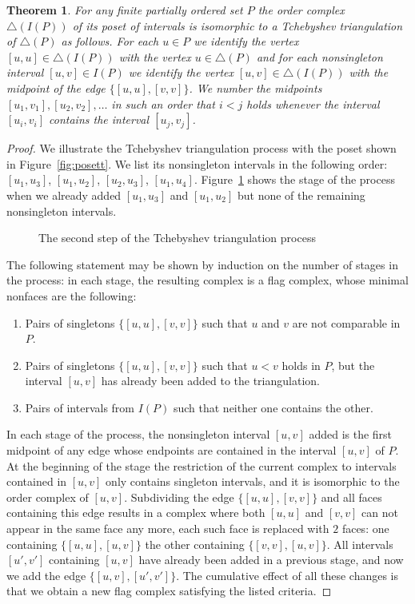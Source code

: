 \documentclass[reqno,12pt]{amsart}
\numberwithin{equation}{section}
\newtheorem{theorem}{Theorem}[section]
\newcommand{\0}{\widehat{0}}
\newcommand{\1}{\widehat{1}}
\newcommand{\2}{\widehat{2}}
\begin{document}
\begin{theorem}
\label{thm:it}
For any finite partially ordered set $P$ the order complex
$\triangle(I(P))$ of its poset of intervals is isomorphic to a
Tchebyshev triangulation of $\triangle(P)$ as follows. For each $u\in
P$ we identify the vertex $[u,u]\in \triangle(I(P))$ with the vertex $u\in
\triangle(P)$ and for each nonsingleton interval $[u,v]\in I(P)$ we
identify the vertex $[u,v]\in \triangle(I(P))$ with the midpoint of the
edge $\{[u,u],[v,v]\}$. We number the midpoints $[u_1,v_1], [u_2,v_2], \ldots$  
in such an order that $i<j$ holds whenever the interval $[u_i,v_i]$
contains the interval $[u_j,v_j]$.
\end{theorem}  
\begin{proof}
We illustrate the Tchebyshev triangulation process with the poset shown
in Figure~\ref{fig:posett}. We list its nonsingleton intervals in the
following order:
$[u_1,u_3]$, $[u_1,u_2]$, $[u_2,u_3]$, $[u_1,u_4]$. Figure~\ref{fig:posettpart}
shows the stage of the process when we already added $[u_1,u_3]$ and
$[u_1,u_2]$ but none of the remaining nonsingleton intervals.
\begin{figure}[h]
  
\caption{The second step of the Tchebyshev triangulation process}  
\label{fig:posettpart}
\end{figure}
The following statement may be shown by induction on the number of stages
in the process: in each stage, the resulting complex is a flag complex,
whose minimal nonfaces are the following:
\begin{enumerate}
\item Pairs of singletons $\{[u,u],[v,v]\}$ such that $u$ and $v$ are
  not comparable in $P$.
\item Pairs of singletons $\{[u,u],[v,v]\}$ such that $u<v$ holds in
  $P$, but the interval $[u,v]$ has already been added to the triangulation.
\item Pairs of intervals from $I(P)$ such that neither one contains the other.
\end{enumerate}  
In each stage of the process, the nonsingleton interval $[u,v]$
added is the first midpoint of any edge whose endpoints are contained in
the interval $[u,v]$ of $P$. At the beginning of the stage the
restriction of the current complex to intervals contained in  $[u,v]$
only contains singleton intervals, and it is isomorphic to the order
complex of $[u,v]$. Subdividing the edge $\{[u,u],[v,v]\}$ and
all faces containing this edge results in a complex where both $[u,u]$
and $[v,v]$ can not appear in the same face any more, each such face is
replaced with $2$ faces: one containing $\{[u,u], [u,v]\}$  the other
containing $\{[v,v], [u,v]\}$. All intervals $[u',v']$ containing
$[u,v]$ have already been added in a previous stage, and now we add the
edge $\{[u,v],[u',v']\}$. The cumulative effect of all these changes is
that we obtain a new flag complex satisfying the listed criteria. 
\end{proof}
\end{document}
